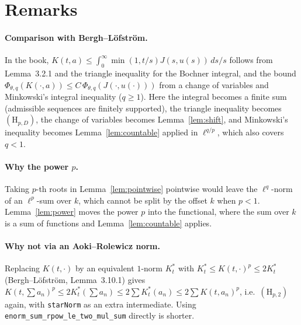 \documentclass[11pt]{article}
\theoremstyle{definition}
\theoremstyle{remark}
\begin{document}
\section{Remarks}

\paragraph{Comparison with Bergh--L\"ofstr\"om.}
In the book, \(K(t,a) \le \int_0^\infty \min(1,t/s)J(s,u(s))\,ds/s\) follows from
Lemma~3.2.1 and the triangle inequality for the Bochner integral, and the bound
\(\Phi_{\theta,q}(K(\cdot,a)) \le C\,\Phi_{\theta,q}(J(\cdot,u(\cdot)))\) from a change of
variables and Minkowski's integral inequality (\(q \ge 1\)). Here the integral becomes a finite
sum (admissible sequences are finitely supported), the triangle inequality becomes
\((\mathrm H_{p,D})\), the change of variables becomes Lemma~\ref{lem:shift}, and Minkowski's
inequality becomes Lemma~\ref{lem:countable} applied in \(\ell^{q/p}\), which also covers
\(q < 1\).

\paragraph{Why the power \(p\).}
Taking \(p\)-th roots in Lemma~\ref{lem:pointwise} pointwise would leave the \(\ell^q\)-norm of
an \(\ell^p\)-sum over \(k\), which cannot be split by the offset \(k\) when \(p < 1\).
Lemma~\ref{lem:power} moves the power \(p\) into the functional, where the sum over \(k\) is
a sum of functions and Lemma~\ref{lem:countable} applies.

\paragraph{Why not via an Aoki--Rolewicz norm.}
Replacing \(K(t,\cdot)\) by an equivalent \(1\)-norm \(K^*_t\) with
\(K^*_t \le K(t,\cdot)^p \le 2K^*_t\) (Bergh--L\"ofstr\"om, Lemma~3.10.1) gives
\(K(t,\sum a_n)^p \le 2K^*_t(\sum a_n) \le 2\sum K^*_t(a_n) \le 2\sum K(t,a_n)^p\), i.e.\
\((\mathrm H_{p,2})\) again, with \texttt{starNorm} as an extra intermediate. Using
\texttt{enorm\_sum\_rpow\_le\_two\_mul\_sum} directly is shorter.
\end{document}
